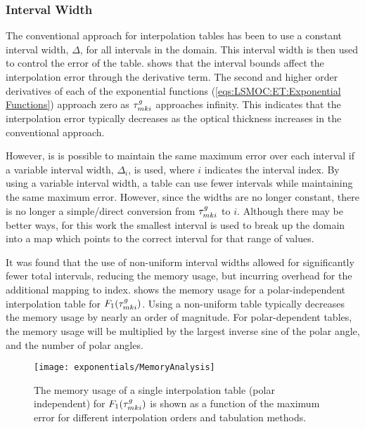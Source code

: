 {{{      \subsubsection{Interval Width}{\label{sssec:LSMOC:ET:Interval Width}
        The conventional approach for interpolation tables has been to use a constant interval width, $\Delta$, for all intervals in the domain.
        This interval width is then used to control the error of the table.
         shows that the interval bounds affect the interpolation error through the derivative term.
        The second and higher order derivatives of each of the exponential functions (\cref{eqs:LSMOC:ET:Exponential Functions}) approach zero as $\segopt$ approaches infinity.
        This indicates that the interpolation error typically decreases as the optical thickness increases in the conventional approach.

        However, is is possible to maintain the same maximum error over each interval if a variable interval width, $\Delta_i$, is used, where $i$ indicates the interval index.
        By using a variable interval width, a table can use fewer intervals while maintaining the same maximum error.
        However, since the widths are no longer constant, there is no longer a simple/direct conversion from $\segopt$ to $i$.
        Although there may be better ways, for this work the smallest interval is used to break up the domain into a map which points to the correct interval for that range of values.

        It was found that the use of non-uniform interval widths allowed for significantly fewer total intervals, reducing the memory usage, but incurring overhead for the additional mapping to index.
         shows the memory usage for a polar-independent interpolation table for $F_1(\segopt)$.
        Using a non-uniform table typically decreases the memory usage by nearly an order of magnitude.
        For polar-dependent tables, the memory usage will be multiplied by the largest inverse sine of the polar angle, and the number of polar angles.

        \begin{figure}
          \centering
          \texttt{[image: exponentials/MemoryAnalysis]}
          \caption{The memory usage of a single interpolation table (polar independent) for $F_1(\segopt)$ is shown as a function of the maximum error for different interpolation orders and tabulation methods.\label{fig:LSMOC:ET:Memory Analysis}}
        \end{figure}

}}}}
